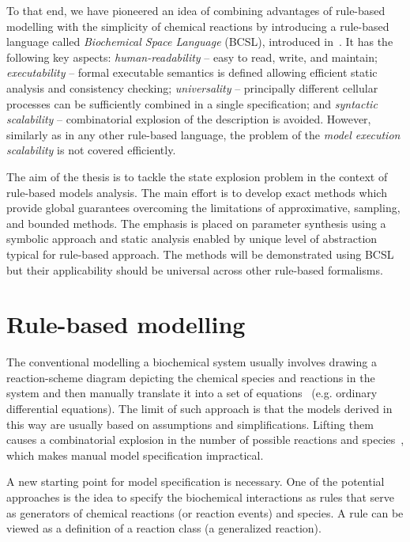 \documentclass[11pt,a4paper]{report}
\begin{document}
To that end, we have pioneered an idea of combining advantages of rule-based modelling with the simplicity of chemical reactions by introducing a rule-based language called \emph{Biochemical Space Language} (BCSL), introduced in~\cite{Ded201627}. It has the following key aspects: \emph{human-readability} -- easy to read, write, and maintain;
\emph{executability} -- formal executable semantics is defined allowing efficient static analysis and consistency checking; \emph{universality} -- principally different cellular processes can be sufficiently combined in a single specification; and \emph{syntactic scalability} -- combinatorial explosion of the description is avoided. However, similarly as in any other rule-based language, the problem of the \emph{model execution scalability} is not covered efficiently.

The aim of the thesis is to tackle the state explosion problem in the context of rule-based models analysis. The main effort is to develop exact methods which provide global guarantees overcoming the limitations of approximative, sampling, and bounded methods. The emphasis is placed on parameter synthesis using a symbolic approach and static analysis enabled by unique level of abstraction typical for rule-based approach. The methods will be demonstrated using BCSL but their applicability should be universal across other rule-based formalisms.

\chapter{Rule-based modelling}
\label{formal}

The conventional modelling a biochemical system usually involves drawing a reaction-scheme diagram depicting the chemical species and reactions in the system and then manually translate it into a set of equations~\cite{voit2000computational} (e.g. ordinary differential equations). The limit of such approach is that the models derived in this way are usually based on assumptions and simplifications. Lifting them causes a combinatorial explosion in the number of possible reactions and species~\cite{blinov2006network}, which makes manual model specification impractical.

A new starting point for model specification is necessary. One of the potential approaches is the idea to specify the biochemical interactions as rules that serve as generators of chemical reactions (or reaction events) and species. A rule can be viewed as a definition of a reaction class (a generalized reaction).
\end{document}

